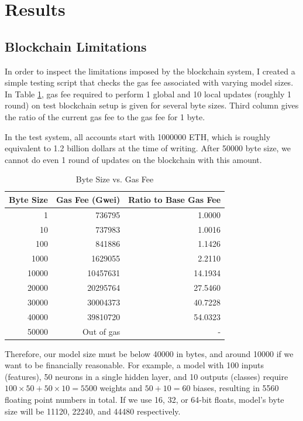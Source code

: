 
\section{Results}

\subsection{Blockchain Limitations}

In order to inspect the limitations imposed by the blockchain system, I created a simple testing script that checks the gas fee associated with varying model sizes.
In Table \ref{tab:gasfees}, gas fee required to perform 1 global and 10 local updates (roughly 1 round) on test blockchain setup is given for several byte sizes.
Third column gives the ratio of the current gas fee to the gas fee for 1 byte.

In the test system, all accounts start with 1000000 ETH, which is roughly equivalent to 1.2 billion dollars at the time of writing.
After 50000 byte size, we cannot do even 1 round of updates on the blockchain with this amount.

\begin{table}[h]
\centering
\label{tab:gasfees}
\begin{tabular}{r|r|r} %
\textbf{Byte Size} & \textbf{Gas Fee (Gwei)} & \textbf{Ratio to Base Gas Fee} \\
\hline
1     &     736795 &  1.0000 \\
10    &     737983 &  1.0016 \\
100   &     841886 &  1.1426 \\
1000  &    1629055 &  2.2110 \\
10000 &   10457631 & 14.1934 \\
20000 &   20295764 & 27.5460 \\
30000 &   30004373 & 40.7228 \\
40000 &   39810720 & 54.0323 \\
50000 & Out of gas &  - \\
\end{tabular}
\caption{Byte Size vs. Gas Fee}
\end{table}

Therefore, our model size must be below 40000 in bytes, and around 10000 if we want to be financially reasonable.
For example, a model with 100 inputs (features), 50 neurons in a single hidden layer, and 10 outputs (classes) require $100 \times 50 + 50 \times 10 = 5500$ weights and $50 + 10 = 60$ biases, resulting in 5560 floating point numbers in total.
If we use 16, 32, or 64-bit floats, model's byte size will be 11120, 22240, and 44480 respectively.

